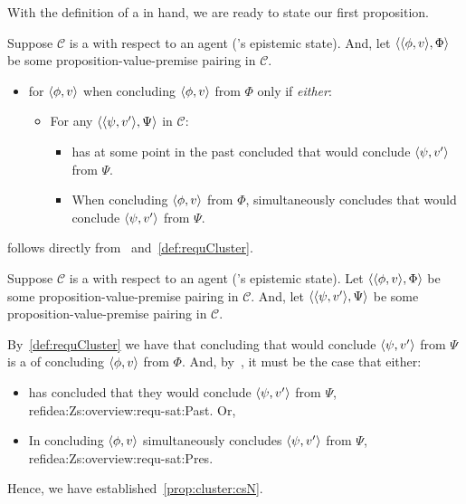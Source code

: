 \begin{note}
  With the definition of a \cluster{} in hand, we are ready to state our first proposition.

  \begin{proposition}
    \label{prop:cluster:csN}
    Suppose \(\mathcal{C}\) is a  with respect to an agent \vAgent{}('s epistemic state).
    And, let \(\langle \langle \phi, v \rangle, \Phi \rangle\) be some proposition-value-premise pairing in \(\mathcal{C}\).

    \begin{itemize}
    \item
      \vAgent{} \csV{} for \(\langle \phi, v \rangle\) when concluding \(\langle \phi, v \rangle\) from \(\Phi\) only if \emph{either}:
      \begin{itemize}
      \item
        For any \(\langle \langle \psi, v' \rangle, \Psi \rangle\) in \(\mathcal{C}\):
        \begin{itemize}
        \item \vAgent{} has at some point in the past concluded that \vAgent{} would conclude \(\langle \psi, v' \rangle\) from \(\Psi\).
        \item
          When concluding \(\langle \phi, v \rangle\) from \(\Phi\), \vAgent{} simultaneously concludes that \vAgent{} would conclude \(\langle \psi, v' \rangle\) from \(\Psi\).
        \end{itemize}
      \end{itemize}
    \end{itemize}
  \end{proposition}

   follows directly from~\iCS{} and~\autoref{def:requCluster}.

  \begin{argument}
    Suppose \(\mathcal{C}\) is a  with respect to an agent \vAgent{}('s epistemic state).
    Let \(\langle \langle \phi, v \rangle, \Phi \rangle\) be some proposition-value-premise pairing in \(\mathcal{C}\).
    And, let \(\langle \langle \psi, v' \rangle, \Psi \rangle\) be some proposition-value-premise pairing in \(\mathcal{C}\).

    By~\autoref{def:requCluster} we have that \vAgent{} concluding that \vAgent{} would conclude \(\langle \psi, v' \rangle\) from \(\Psi\) is a \requ{} of concluding \(\langle \phi, v \rangle\) from \(\Phi\).
    And, by~\iCS{}, it must be the case that either:
    \begin{itemize}
    \item
      \vAgent{} has concluded that they would conclude \(\langle \psi, v' \rangle\) from \(\Psi\), ref{idea:Zs:overview:requ-sat:Past}.
      Or,
    \item
      In concluding \(\langle \phi, v \rangle\) \vAgent{} simultaneously concludes \(\langle \psi, v' \rangle\) from \(\Psi\), ref{idea:Zs:overview:requ-sat:Pres}.
    \end{itemize}
    Hence, we have established~\ref{prop:cluster:csN}.
  \end{argument}
\end{note}

